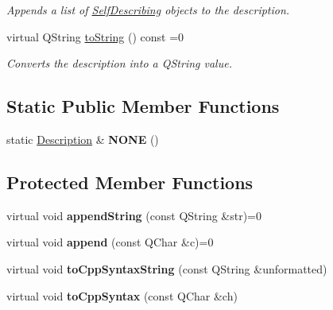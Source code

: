 \begin{DoxyCompactItemize}
\begin{DoxyCompactList}\small\item\em Appends a list of \hyperlink{class_hamcrest_qt_1_1_self_describing}{Self\-Describing} objects to the description. \end{DoxyCompactList}\item 
\hypertarget{class_hamcrest_qt_1_1_description_aaee6521f18333eaeb4753099fa040116}{virtual Q\-String \hyperlink{class_hamcrest_qt_1_1_description_aaee6521f18333eaeb4753099fa040116}{to\-String} () const =0}\label{class_hamcrest_qt_1_1_description_aaee6521f18333eaeb4753099fa040116}

\begin{DoxyCompactList}\small\item\em Converts the description into a {\ttfamily Q\-String} value. \end{DoxyCompactList}\end{DoxyCompactItemize}
\subsection*{Static Public Member Functions}
\begin{DoxyCompactItemize}
\item 
\hypertarget{class_hamcrest_qt_1_1_description_a7f7e1276e3c41c890f83f147ddffad16}{static \hyperlink{class_hamcrest_qt_1_1_description}{Description} \& {\bfseries N\-O\-N\-E} ()}\label{class_hamcrest_qt_1_1_description_a7f7e1276e3c41c890f83f147ddffad16}

\end{DoxyCompactItemize}
\subsection*{Protected Member Functions}
\begin{DoxyCompactItemize}
\item 
\hypertarget{class_hamcrest_qt_1_1_description_a355744585a874de9ccd6bab303826a71}{virtual void {\bfseries append\-String} (const Q\-String \&str)=0}\label{class_hamcrest_qt_1_1_description_a355744585a874de9ccd6bab303826a71}

\item 
\hypertarget{class_hamcrest_qt_1_1_description_ad691e2adacec9d180ce13940e84e80c8}{virtual void {\bfseries append} (const Q\-Char \&c)=0}\label{class_hamcrest_qt_1_1_description_ad691e2adacec9d180ce13940e84e80c8}

\item 
\hypertarget{class_hamcrest_qt_1_1_description_a4bc07ffd801a681b3698aac5c3e2f79f}{virtual void {\bfseries to\-Cpp\-Syntax\-String} (const Q\-String \&unformatted)}\label{class_hamcrest_qt_1_1_description_a4bc07ffd801a681b3698aac5c3e2f79f}

\item 
\hypertarget{class_hamcrest_qt_1_1_description_a01bdce4a7500e30f997f78332521de36}{virtual void {\bfseries to\-Cpp\-Syntax} (const Q\-Char \&ch)}\label{class_hamcrest_qt_1_1_description_a01bdce4a7500e30f997f78332521de36}

\end{DoxyCompactItemize}


